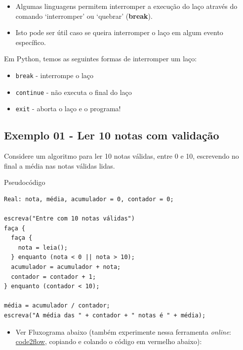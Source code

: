 \documentclass[12pt,a4paper]{article}
\providecommand{\tightlist}{%
      \setlength{\itemsep}{0pt}\setlength{\parskip}{0pt}}
\begin{document}
    \begin{itemize}
\item
  Algumas linguagens permitem interromper a execução do laço através do
  comando `interromper' ou `quebrar' (\textbf{break}).
\item
  Isto pode ser útil caso se queira interromper o laço em algum evento
  específico.
\end{itemize}

    Em Python, temos as seguintes formas de interromper um laço:

\begin{itemize}
\tightlist
\item
  \texttt{break} - interrompe o laço
\item
  \texttt{continue} - não executa o final do laço
\item
  \texttt{exit} - aborta o laço e o programa!
\end{itemize}

    \hypertarget{exemplo-01---ler-10-notas-com-validauxe7uxe3o}{%
\subsection{Exemplo 01 - Ler 10 notas com
validação}\label{exemplo-01---ler-10-notas-com-validauxe7uxe3o}}

Considere um algoritmo para ler 10 notas válidas, entre 0 e 10,
escrevendo no final a média nas notas válidas lidas.

    Pseudocódigo

\begin{verbatim}
Real: nota, média, acumulador = 0, contador = 0;

escreva("Entre com 10 notas válidas")
faça {
  faça {
    nota = leia();
  } enquanto (nota < 0 || nota > 10);
  acumulador = acumulador + nota;
  contador = contador + 1;
} enquanto (contador < 10);

média = acumulador / contador;
escreva("A média das " + contador + " notas é " + média);
\end{verbatim}

    \begin{itemize}
\tightlist
\item
  Ver Fluxograma abaixo (também experimente nessa ferramenta
  \emph{online}: \href{https://app.code2flow.com/}{code2flow}, copiando
  e colando o código em vermelho abaixo):
\end{itemize}
\end{document}
